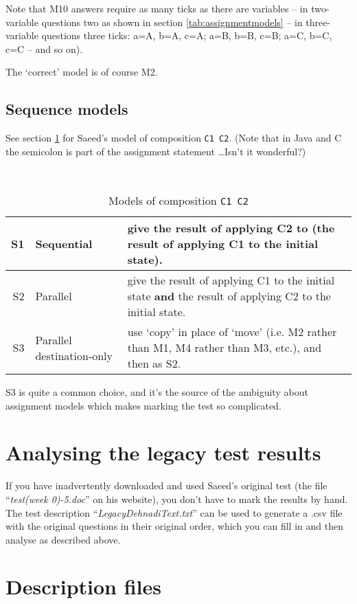 \documentclass[11pt,a4paper]{article}
\newcommand{\seclabel}[1]{\label{sec:#1}}
\newcommand{\tablabel}[1]{\label{tab:#1}}
\newcommand{\tabref}[1]{section \ref{tab:#1}}
\newcommand{\vstrut}[1]{\rule{0pt}{#1}}
\begin{document}
Note that M10 answers require as many ticks as there are variables -- in two-variable questions two as shown in \tabref{assignmentmodels} -- in three-variable questions three ticks: a=A, b=A, c=A; a=B, b=B, c=B; a=C, b=C, c=C -- and so on).

The `correct' model is of course M2.

\subsection{Sequence models}
\seclabel{sequencemodels}
See \tabref{sequencemodels} for Saeed's model of composition \texttt{C1 C2}. (Note that in Java and C the semicolon is part of the assignment statement \dots Isn't it wonderful?)
\begin{table}
\caption{Models of composition \texttt{C1 C2}}
\centering
\vstrut{2pt}\\
\begin{tabular}{|r|l|p{250pt}|}
\hline
S1 & Sequential & give the result of applying C2 to (the result of applying C1 to the initial state). \\
\hline
S2 & Parallel & give the result of applying C1 to the initial state \textbf{and} the result of applying C2 to the initial state. \\
\hline
S3 & Parallel destination-only & use `copy' in place of `move' (i.e. M2 rather than M1, M4 rather than M3, etc.), and then as S2. \\
\hline
\end{tabular}
\tablabel{sequencemodels}
\end{table}

S3 is quite a common choice, and it's the source of the ambiguity about assignment models which makes marking the test so complicated.

\newpage
\section{Analysing the legacy test results}

If you have inadvertently downloaded and used Saeed's original test (the file ``\emph{test(week 0)-5.doc}'' on his website), you don't have to mark the results by hand. The test description ``\emph{LegacyDehnadiText.txt}'' can be used to generate a .csv file with the original questions in their original order, which you can fill in and then analyse as described above.

\newpage
\appendix
\section{Description files}
\end{document}

